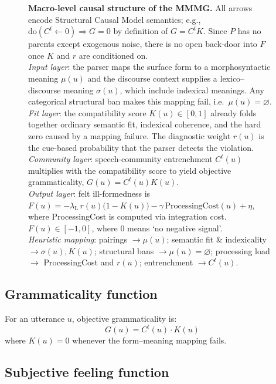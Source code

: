 \documentclass[12pt]{article}
\begin{document}
\begin{figure}[htbp]
\caption[Macro-level causal structure]%
{\textbf{Macro-level causal structure of the MMMG.} All arrows encode Structural Causal Model semantics; e.g., $\text{do}(C^{t} \leftarrow 0) \Rightarrow G = 0$ by definition of $G = C^{t}K$. Since $P$ has no parents except exogenous noise, there is no open back-door into $F$ once $K$ and $r$ are conditioned on.
\\\emph{Input layer}: the parser maps the surface form to a morphosyntactic meaning $\mu(u)$
and the discourse context supplies a lexico–discourse meaning $\sigma(u)$, which include indexical meanings.
Any categorical structural ban makes this mapping fail, i.e.\ $\mu(u)=\varnothing$.
\\\emph{Fit layer}: the compatibility score $K(u)\!\in[0,1]$ already folds together ordinary
semantic fit, indexical coherence, and the hard zero caused by a mapping failure.
The diagnostic weight $r(u)$ is the cue-based probability that the parser detects the
violation. 
\\\emph{Community layer}: speech-community entrenchment $C^{t}(u)$ multiplies with the
compatibility score to yield objective grammaticality,
$G(u)=C^{t}(u)K(u)$.
\\\emph{Output layer}: felt ill-formedness is
$F(u)= -\lambda_{\mathrm L}\,r(u)\!\bigl(1-K(u)\bigr)
       -\gamma\,\text{ProcessingCost}(u)+\eta$,
where ProcessingCost is computed via integration cost. $F(u)\!\in[-1,0]$, where 0 means `no negative signal'.
\\\emph{Heuristic mapping}: pairings $\to\mu(u)$;
semantic fit \& indexicality $\to\sigma(u),K(u)$;
structural bans $\to\mu(u)=\varnothing$;
processing load $\to$ ProcessingCost and $r(u)$;
entrenchment $\to C^{t}(u)$.}
\label{fig:causal-dag}
\end{figure}

\subsection{Grammaticality function}

For an utterance $u$, objective grammaticality is:
\begin{equation}\label{eq:G}
G(u)=C^{t}(u)\cdot K(u)
\end{equation}
where $K(u) = 0$ whenever the form–meaning mapping fails.

\subsection{Subjective feeling function}
\end{document}
